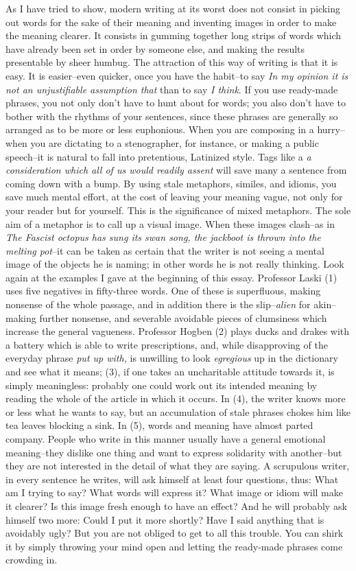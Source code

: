 \documentclass[a4paper]{article}
\begin{document}
As I have tried to show, modern writing at its worst does not consist in picking out words for the sake of their meaning and inventing images in order to make the meaning clearer. It consists in gumming together long strips of words which have already been set in order by someone else, and making the results presentable by sheer humbug. The attraction of this way of writing is that it is easy. It is easier--even quicker, once you have the habit--to say \textit{In my opinion it is not an unjustifiable assumption that} than to say \textit{I think}. If you use ready-made phrases, you not only don't have to hunt about for words; you also don't have to bother with the rhythms of your sentences, since these phrases are generally so arranged as to be more or less euphonious. When you are composing in a hurry--when you are dictating to a stenographer, for instance, or making a public speech--it is natural to fall into pretentious, Latinized style. Tags like a \textit{a consideration which all of us would readily assent} will save many a sentence from coming down with a bump. By using stale metaphors, similes, and idioms, you save much mental effort, at the cost of leaving your meaning vague, not only for your reader but for yourself. This is the significance of mixed metaphors. The sole aim of a metaphor is to call up a visual image. When these images clash--as in \textit{The Fascist octopus has sung its swan song, the jackboot is thrown into the melting pot}--it can be taken as certain that the writer is not seeing a mental image of the objects he is naming; in other words he is not really thinking. Look again at the examples I gave at the beginning of this essay. Professor Laski (1) uses five negatives in fifty-three words. One of these is superfluous, making nonsense of the whole passage, and in addition there is the slip--\textit{alien} for akin--making further nonsense, and severable avoidable pieces of clumsiness which increase the general vagueness. Professor Hogben (2) plays ducks and drakes with a battery which is able to write prescriptions, and, while disapproving of the everyday phrase \textit{put up with,} is unwilling to look \textit{egregious} up in the dictionary and see what it means; (3), if one takes an uncharitable attitude towards it, is simply meaningless: probably one could work out its intended meaning by reading the whole of the article in which it occurs. In (4), the writer knows more or less what he wants to say, but an accumulation of stale phrases chokes him like tea leaves blocking a sink. In (5), words and meaning have almost parted company. People who write in this manner usually have a general emotional meaning--they dislike one thing and want to express solidarity with another--but they are not interested in the detail of what they are saying. A scrupulous writer, in every sentence he writes, will ask himself at least four questions, thus: What am I trying to say? What words will express it? What image or idiom will make it clearer? Is this image fresh enough to have an effect? And he will probably ask himself two more: Could I put it more shortly? Have I said anything that is avoidably ugly? But you are not obliged to get to all this trouble. You can shirk it by simply throwing your mind open and letting the ready-made phrases come crowding in. 
\end{document}
